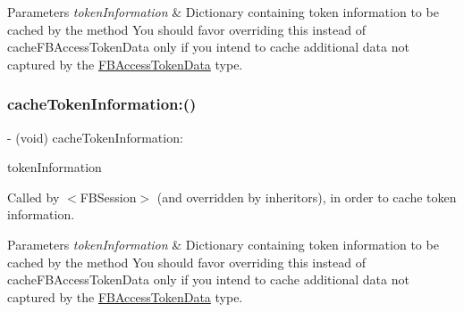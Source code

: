 \begin{DoxyParams}{Parameters}
{\em token\+Information} & Dictionary containing token information to be cached by the method  You should favor overriding this instead of {\ttfamily cache\+F\+B\+Access\+Token\+Data} only if you intend to cache additional data not captured by the \hyperlink{interfaceFBAccessTokenData}{F\+B\+Access\+Token\+Data} type. \\
\hline
\end{DoxyParams}
\mbox{\label{interfaceFBSessionTokenCachingStrategy_a89929f2fc1d8d29bb1add6e607d7c864}} 
\subsubsection{\texorpdfstring{cache\+Token\+Information\+:()}{cacheTokenInformation:()}\hspace{0.1cm}{\footnotesize\ttfamily [4/5]}}
{\footnotesize\ttfamily -\/ (void) cache\+Token\+Information\+: \begin{DoxyParamCaption}\item[{(N\+S\+Dictionary $\ast$)}]{token\+Information }\end{DoxyParamCaption}}

Called by $<$\+F\+B\+Session$>$ (and overridden by inheritors), in order to cache token information.


\begin{DoxyParams}{Parameters}
{\em token\+Information} & Dictionary containing token information to be cached by the method  You should favor overriding this instead of {\ttfamily cache\+F\+B\+Access\+Token\+Data} only if you intend to cache additional data not captured by the \hyperlink{interfaceFBAccessTokenData}{F\+B\+Access\+Token\+Data} type. \\
\hline
\end{DoxyParams}
\mbox{\label{interfaceFBSessionTokenCachingStrategy_a89929f2fc1d8d29bb1add6e607d7c864}} 
